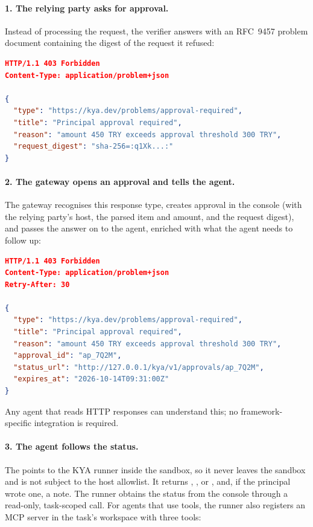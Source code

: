 \paragraph{1. The relying party asks for approval.} Instead of processing the request, the verifier answers with an RFC~9457 problem document containing the digest of the request it refused:

\begin{lstlisting}[language=json]
HTTP/1.1 403 Forbidden
Content-Type: application/problem+json

{
  "type": "https://kya.dev/problems/approval-required",
  "title": "Principal approval required",
  "reason": "amount 450 TRY exceeds approval threshold 300 TRY",
  "request_digest": "sha-256=:q1Xk...:"
}
\end{lstlisting}

\paragraph{2. The gateway opens an approval and tells the agent.} The gateway recognises this response type, creates approval  in the console (with the relying party's host, the parsed item and amount, and the request digest), and passes the answer on to the agent, enriched with what the agent needs to follow up:

\begin{lstlisting}[language=json]
HTTP/1.1 403 Forbidden
Content-Type: application/problem+json
Retry-After: 30

{
  "type": "https://kya.dev/problems/approval-required",
  "title": "Principal approval required",
  "reason": "amount 450 TRY exceeds approval threshold 300 TRY",
  "approval_id": "ap_7Q2M",
  "status_url": "http://127.0.0.1/kya/v1/approvals/ap_7Q2M",
  "expires_at": "2026-10-14T09:31:00Z"
}
\end{lstlisting}

Any agent that reads HTTP responses can understand this; no framework-specific integration is required.

\paragraph{3. The agent follows the status.} The  points to the KYA runner inside the sandbox, so it never leaves the sandbox and is not subject to the host allowlist. It returns , ,  or , and, if the principal wrote one, a note. The runner obtains the status from the console through a read-only, task-scoped call. For agents that use tools, the runner also registers an MCP server in the task's workspace with three tools:

